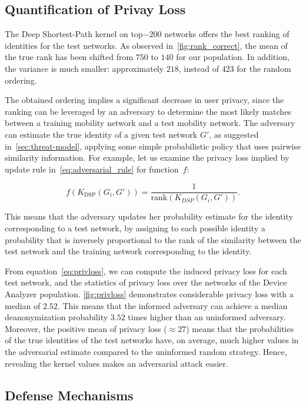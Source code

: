 \subsection{Quantification of Privay Loss}



The Deep Shortest-Path kernel on top$-200$ networks offers the best ranking of identities for the test networks.
As observed in~\cref{fig:rank_correct}, the mean of the true rank has been shifted from $ 750 $ to $ 140 $ for our population.
In addition, the variance is much smaller: approximately $ 218 $, instead of $ 423 $ for the random ordering.

The obtained ordering implies a significant decrease in user privacy, since the ranking can be leveraged by an adversary to determine the most likely matches between a training mobility network and a test mobility network.
The adversary can estimate the true identity of a given test network $ G' $, as suggested in~\cref{sec:threat-model}, applying some simple probabilistic policy that uses pairwise similarity information. For example, let us examine the privacy loss implied by update rule in~\eqref{eq:adversarial_rule} for  \mbox{function $ f$}:

\[
f\left(K_{\text{DSP}}(G_i, G')\right) =\frac{1}{\text{rank}\left(K_{DSP}(G_i, G')\right)}.
\label{eq:inverse_rank}
\]

This means that the adversary updates her probability estimate for the identity corresponding to a test network, by assigning to each possible identity a probability that is inversely proportional to the rank of the similarity between the test network and the training network corresponding to the identity.

From equation~\eqref{eq:privloss}, we can compute the induced privacy loss for each test network, and the statistics of privacy loss over the networks of the Device Analyzer population.
\cref{fig:privloss} demonstrates considerable privacy loss with a median of $ 2.52 $.
This means that the informed adversary can achieve a median deanonymization probability $3.52$ times higher than an uninformed adversary.
Moreover, the positive mean of privacy loss ($ {\approx  27}$) means that the probabilities of  the true identities of the test networks have, on average, much higher values in the adversarial estimate compared to the uninformed random strategy.
Hence, revealing the kernel values makes an adversarial attack easier.

\subsection{Defense Mechanisms }

